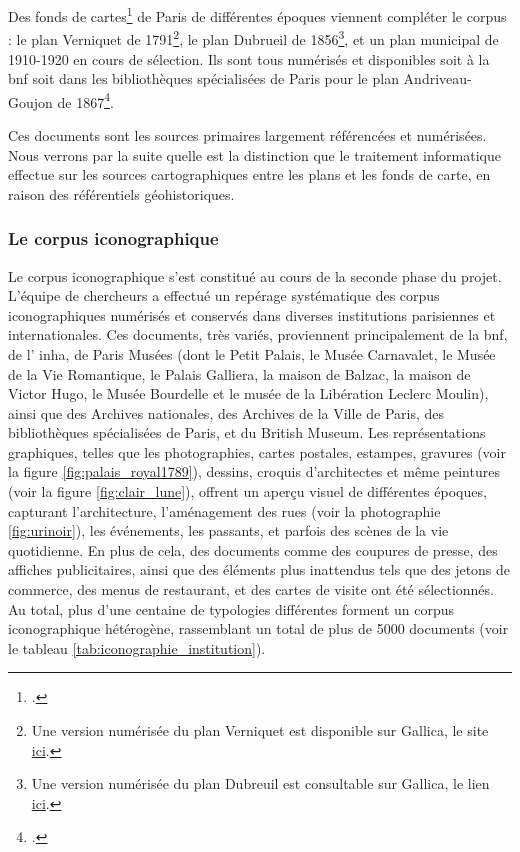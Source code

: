 Des fonds de cartes\footcite{ESRIDefinition2024} de Paris de différentes époques viennent compléter le corpus : le plan Verniquet de 1791\footnote{Une version numérisée du plan Verniquet est disponible sur Gallica, le site \href{https://gallica.bnf.fr/view3if/ga/ark:/12148/btv1b55013275x}{ici}.}, le plan Dubrueil de 1856\footnote{Une version numérisée du plan Dubreuil est consultable sur Gallica, le lien \href{https://gallica.bnf.fr/view3if/ga/ark:/12148/btv1b53085562p}{ici}.}, et un plan municipal de 1910-1920 en cours de sélection. Ils sont tous numérisés et disponibles soit à la \acrshort{bnf} soit dans les bibliothèques spécialisées de Paris pour le plan Andriveau-Goujon de 1867\footcite{ANDRIVEAU-GOUJONPlan1867}.

Ces documents sont les sources primaires largement référencées et numérisées. Nous verrons par la suite quelle est la distinction que le traitement informatique effectue sur les sources cartographiques entre les plans et les fonds de carte, en raison des référentiels géohistoriques.
 
\subsubsection{Le corpus iconographique}

Le corpus iconographique s'est constitué au cours de la seconde phase du projet. L'équipe de chercheurs a effectué un repérage systématique des corpus iconographiques numérisés et conservés dans diverses institutions parisiennes et internationales. Ces documents, très variés, proviennent principalement de la \acrshort{bnf}, de l' \acrshort{inha}, de Paris Musées (dont le Petit Palais, le Musée Carnavalet, le Musée de la Vie Romantique, le Palais Galliera, la maison de Balzac, la maison de Victor Hugo, le Musée Bourdelle et le musée de la Libération Leclerc Moulin), ainsi que des Archives nationales, des Archives de la Ville de Paris, des bibliothèques spécialisées de Paris, et du British Museum. Les représentations graphiques, telles que les photographies, cartes postales, estampes, gravures (voir la figure \ref{fig:palais_royal1789}), dessins, croquis d'architectes et même peintures (voir la figure \ref{fig:clair_lune}), offrent un aperçu visuel de différentes époques, capturant l'architecture, l'aménagement des rues (voir la photographie \ref{fig:urinoir}), les événements, les passants, et parfois des scènes de la vie quotidienne. En plus de cela, des documents comme des coupures de presse, des affiches publicitaires, ainsi que des éléments plus inattendus tels que des jetons de commerce, des menus de restaurant, et des cartes de visite ont été sélectionnés. Au total, plus d'une centaine de typologies différentes forment un corpus iconographique hétérogène, rassemblant un total de plus de 5000 documents (voir le tableau \ref{tab:iconographie_institution}).

